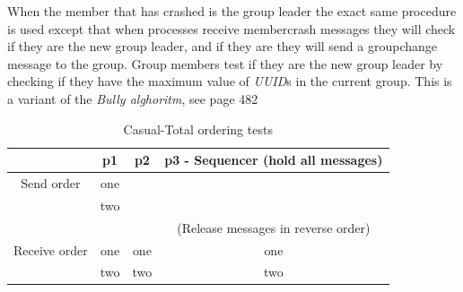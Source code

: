 \documentclass[titlepage, twocolumn, a4paper, 10pt]{article}
\begin{document}
When the member that has crashed is the group leader the exact same procedure is used except that when processes receive membercrash messages they will check if they are the new group leader, and if they are they will send a groupchange message to the group. Group members test if they are the new group leader by checking if they have the maximum value of \textit{UUID}s in the current group. This is a variant of the \textit{Bully alghoritm}, see page 482


\begin{table}[H]
  \centering
  \begin{footnotesize}
    \begin{tabular} {c | c | c | c}
      & p1 & p2 & p3 - Sequencer (hold all messages) \\
      \hline
      Send order & one &  &  \\
      & two &  &  \\
      \hline
      &  &  & (Release messages in reverse order) \\
      \hline
      Receive order & one & one & one \\
      & two & two & two \\
    \end{tabular}
  \end{footnotesize}
  \caption{Casual-Total ordering tests}
  \label{tbl:castot}
\end{table}

\end{document}

